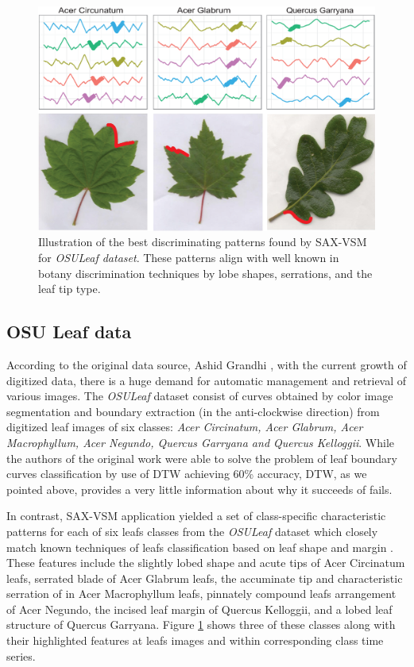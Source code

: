 \documentclass{llncs}
\newcommand{\myfigureshrinker}{\vspace{-1cm}}
\begin{document}
\begin{figure}[t]
   \myfigureshrinker
   \centering
   \includegraphics[width=115mm]{figures/AcerCircunatum.eps}
   \caption{Illustration of the best discriminating patterns found by SAX-VSM for
\textit{OSULeaf dataset}. These patterns align with well known in botany discrimination techniques
by lobe shapes, serrations, and the leaf tip type.}
   \label{fig:shapelet-acer-patterns}
\end{figure}

\subsection{OSU Leaf data}
According to the original data source, Ashid Grandhi \cite{osuleaf}, with the current growth of
digitized data, there is a huge demand for automatic management and retrieval of various images. The
\textit{OSULeaf} dataset consist of curves obtained by color image segmentation and boundary
extraction (in the anti-clockwise direction) from digitized leaf images of six classes: \textit{Acer
Circinatum, Acer Glabrum, Acer Macrophyllum, Acer Negundo, Quercus Garryana and Quercus Kelloggii}.
While the authors of the original work were able to solve the problem of leaf boundary curves
classification by use of DTW achieving 60\% accuracy, DTW, as we pointed above, provides a very
little information about why it succeeds of fails. 

In contrast, SAX-VSM application yielded a set of class-specific characteristic patterns for each of
six leafs classes from the \textit{OSULeaf} dataset which closely match known techniques of leafs
classification based on leaf shape and margin \cite{dirr}. These features include the slightly
lobed shape and acute tips of Acer Circinatum leafs, serrated blade of Acer Glabrum leafs,
the accuminate tip and characteristic serration of in Acer Macrophyllum leafs, pinnately compound
leafs arrangement of Acer Negundo, the incised leaf margin of Quercus Kelloggii, and a lobed leaf
structure of Quercus Garryana. Figure \ref{fig:shapelet-acer-patterns} shows three of these classes
along with their highlighted features at leafs images and within corresponding class time series.
\end{document}
